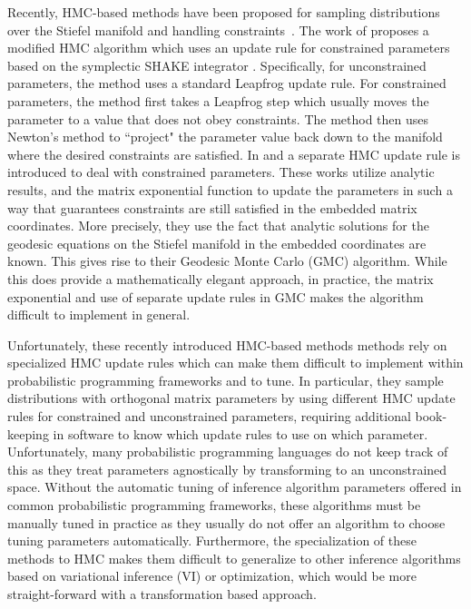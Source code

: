 \documentclass[ba]{imsart}
\numberwithin{equation}{section}
\theoremstyle{plain}
\begin{document}
\noindent Recently, HMC-based methods have been proposed for sampling distributions over the Stiefel manifold and handling constraints~\citep{brubaker2012family,byrne2013geodesic,holbrook2016bayesian}. The work of \cite{brubaker2012family} proposes a modified HMC algorithm which uses an update rule for constrained parameters based on the symplectic SHAKE integrator \citep{leimkuhler2004simulating}. Specifically, for unconstrained parameters, the method uses a standard Leapfrog update rule. For constrained parameters, the method first takes a Leapfrog step which usually moves the parameter to a value that does not obey constraints. The method then uses Newton's method to ``project" the parameter value back down to the manifold where the desired constraints are satisfied. In \citet{byrne2013geodesic} and \citet{holbrook2016bayesian} a separate HMC update rule is introduced to deal with constrained parameters. These works utilize analytic results, and the matrix exponential function to update the parameters in such a way that guarantees constraints are still satisfied in the embedded matrix coordinates. More precisely, they use the fact that analytic solutions for the geodesic equations on the Stiefel manifold in the embedded coordinates are known. This gives rise to their Geodesic Monte Carlo (GMC) algorithm. While this does provide a mathematically elegant approach, in practice, the matrix exponential and use of separate update rules in GMC makes the algorithm difficult to implement in general.

\noindent Unfortunately, these recently introduced HMC-based methods methods rely on specialized HMC update rules which can make them difficult to implement within probabilistic programming frameworks and to tune. In particular, they sample distributions with orthogonal matrix parameters by using different HMC update rules for constrained and unconstrained parameters, requiring additional book-keeping in software to know which update rules to use on which parameter. Unfortunately, many probabilistic programming languages do not keep track of this as they treat parameters agnostically by transforming to an unconstrained space. Without the automatic tuning of inference algorithm parameters offered in common probabilistic programming frameworks, these algorithms must be manually tuned in practice as they usually do not offer an algorithm to choose tuning parameters automatically. Furthermore, the specialization of these methods to HMC makes them difficult to generalize to other inference algorithms based on variational inference (VI) or optimization, which would be more straight-forward with a transformation based approach.
\end{document}
